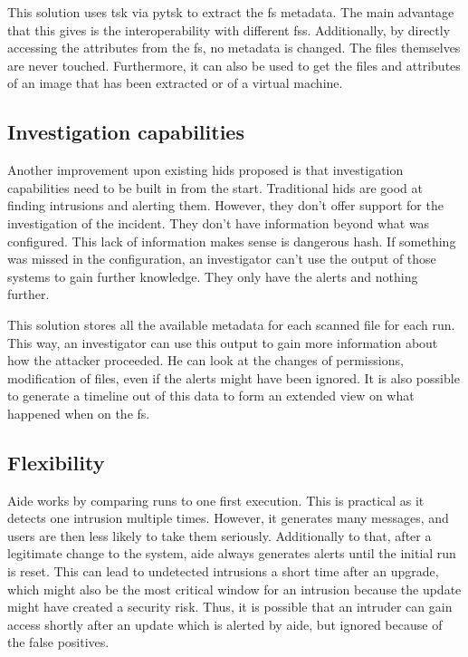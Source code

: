 This solution uses \gls{tsk} via \gls{pytsk} to extract the \gls{fs} \gls{metadata}. The main advantage that this gives is the interoperability with different \glspl{fs}. Additionally, by directly accessing the attributes from the \gls{fs}, no \gls{metadata} is changed. The files themselves are never touched. Furthermore, it can also be used to get the files and attributes of an image that has been extracted or of a virtual machine. 

\subsection{Investigation capabilities}
\label{sec:investigation:capabilities}
Another improvement upon existing \gls{hids} proposed is that investigation capabilities need to be built in from the start. Traditional \gls{hids} are good at finding intrusions and alerting them. However, they don't offer support for the investigation of the incident. They don't have information beyond what was configured. This lack of information makes sense is dangerous \gls{hash}. If something was missed in the configuration, an investigator can't use the output of those systems to gain further knowledge. They only have the alerts and nothing further.

This solution stores all the available \gls{metadata} for each scanned file for each run. This way, an investigator can use this output to gain more information about how the attacker proceeded. He can look at the changes of permissions, modification of files, even if the alerts might have been ignored. It is also possible to generate a timeline out of this data to form an extended view on what happened when on the \gls{fs}. 

\subsection{Flexibility}

Aide works by comparing runs to one first execution. This is practical as it detects one intrusion multiple times. However, it generates many messages, and users are then less likely to take them seriously. Additionally to that, after a legitimate change to the system, aide always generates alerts until the initial run is reset. This can lead to undetected intrusions a short time after an upgrade, which might also be the most critical window for an intrusion because the update might have created a security risk. Thus, it is possible that an intruder can gain access shortly after an update which is alerted by aide, but ignored because of the false positives.

